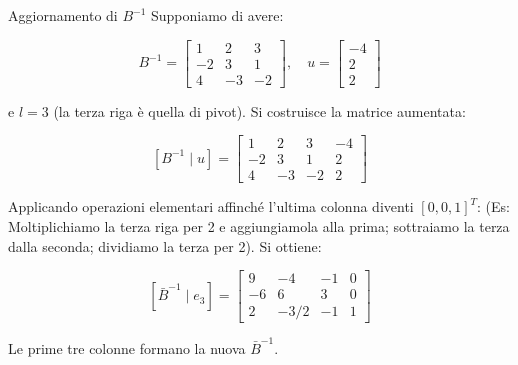 \begin{example}{Aggiornamento di $B^{-1}$}
Supponiamo di avere:


$$B^{-1} = \begin{bmatrix} 1 & 2 & 3 \\ -2 & 3 & 1 \\ 4 & -3 & -2 \end{bmatrix}, \quad u = \begin{bmatrix} -4 \\ 2 \\ 2 \end{bmatrix}$$


e $l = 3$ (la terza riga è quella di pivot). Si costruisce la matrice aumentata:


$$[B^{-1} \mid u] = \begin{bmatrix} 1 & 2 & 3 & -4 \\ -2 & 3 & 1 & 2 \\ 4 & -3 & -2 & 2 \end{bmatrix}$$


Applicando operazioni elementari affinché l'ultima colonna diventi $[0, 0, 1]^T$:
(Es: Moltiplichiamo la terza riga per 2 e aggiungiamola alla prima; sottraiamo la terza dalla seconda; dividiamo la terza per 2). Si ottiene:


$$[\bar{B}^{-1} \mid e_3] = \begin{bmatrix} 9 & -4 & -1 & 0 \\ -6 & 6 & 3 & 0 \\ 2 & -3/2 & -1 & 1 \end{bmatrix}$$


Le prime tre colonne formano la nuova $\bar{B}^{-1}$.
\end{example}

\newpage

